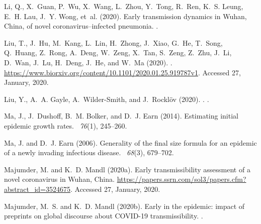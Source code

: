 \documentclass[12pt]{article}
\begin{document}
\begin{thebibliography}{}
Li, Q., X.~Guan, P.~Wu, X.~Wang, L.~Zhou, Y.~Tong, R.~Ren, K.~S. Leung, E.~H.
  Lau, J.~Y. Wong, et~al. (2020).
\newblock Early transmission dynamics in {Wuhan, China}, of novel
  coronavirus--infected pneumonia.
.

Liu, T., J.~Hu, M.~Kang, L.~Lin, H.~Zhong, J.~Xiao, G.~He, T.~Song, Q.~Huang,
  Z.~Rong, A.~Deng, W.~Zeng, X.~Tan, S.~Zeng, Z.~Zhu, J.~Li, D.~Wan, J.~Lu,
  H.~Deng, J.~He, and W.~Ma (2020).
.
\newblock \url{https://www.biorxiv.org/content/10.1101/2020.01.25.919787v1}.
  Accessed 27, January, 2020.

Liu, Y., A.~A. Gayle, A.~Wilder-Smith, and J.~Rockl{\"o}v (2020).
.
.

Ma, J., J.~Dushoff, B.~M. Bolker, and D.~J. Earn (2014).
\newblock Estimating initial epidemic growth rates.
~{\em 76\/}(1), 245--260.

Ma, J. and D.~J. Earn (2006).
\newblock Generality of the final size formula for an epidemic of a newly
  invading infectious disease.
~{\em 68\/}(3), 679--702.

Majumder, M. and K.~D. Mandl (2020a).
\newblock Early transmissibility assessment of a novel coronavirus in {Wuhan,
  China}.
\newblock \url{https://papers.ssrn.com/sol3/papers.cfm?abstract_id=3524675}.
  Accessed 27, January, 2020.

Majumder, M.~S. and K.~D. Mandl (2020b).
\newblock Early in the epidemic: impact of preprints on global discourse about
  {COVID-19} transmissibility.
.


\end{thebibliography}
\end{document}
